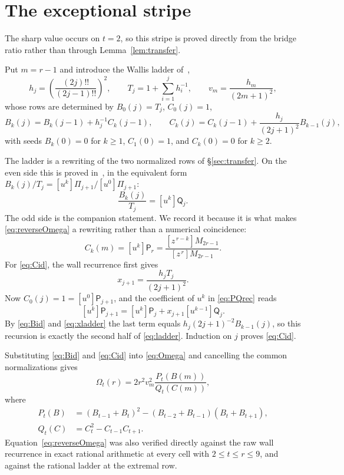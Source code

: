 \documentclass[11pt,a4paper]{article}
\theoremstyle{plain}
\theoremstyle{remark}
\begin{document}
\section{The exceptional stripe}\label{sec:t2}

The sharp value occurs on $t=2$, so this stripe is proved directly from the
bridge ratio rather than through Lemma~\ref{lem:transfer}.

Put $m=r-1$ and introduce the Wallis ladder of~\cite{squaretail},
\[
 h_j=\left(\frac{(2j)!!}{(2j-1)!!}\right)^2,
 \qquad
 T_j=1+\sum_{i=1}^{j}h_i^{-1},
 \qquad
 v_m=\frac{h_m}{(2m+1)^2},
\]
whose rows are determined by $B_0(j)=T_j$, $C_0(j)=1$,
\begin{equation}\label{eq:ladder}
 B_k(j)=B_k(j-1)+h_j^{-1}C_k(j-1),
 \qquad
 C_k(j)=C_k(j-1)+\frac{h_j}{(2j+1)^2}B_{k-1}(j),
\end{equation}
with seeds $B_k(0)=0$ for $k\ge1$, $C_1(0)=1$, and $C_k(0)=0$ for $k\ge2$.

The ladder is a rewriting of the two normalized rows of
\S\ref{sec:transfer}.  On the even side this is proved in~\cite{squaretail},
in the equivalent form $B_k(j)/T_j=[u^k]\Pi_{j+1}/[u^0]\Pi_{j+1}$:
\begin{equation}\label{eq:Bid}
 \frac{B_k(j)}{T_j}=[u^k]\mathsf Q_j .
\end{equation}
The odd side is the companion statement.  We record it because it is what
makes \eqref{eq:reverseOmega} a rewriting rather than a numerical
coincidence:
\begin{equation}\label{eq:Cid}
 C_k(m)=[u^k]\mathsf P_r
 =\frac{[z^{\,r-k}]M_{2r-1}}{[z^{\,r}]M_{2r-1}} .
\end{equation}
For \eqref{eq:Cid}, the wall recurrence first gives
\begin{equation}\label{eq:xladder}
 x_{j+1}=\frac{h_jT_j}{(2j+1)^2}.
\end{equation}
Now $C_0(j)=1=[u^0]\mathsf P_{j+1}$, and the coefficient of $u^k$ in
\eqref{eq:PQrec} reads
\[
 [u^k]\mathsf P_{j+1}=[u^k]\mathsf P_j+x_{j+1}[u^{k-1}]\mathsf Q_j .
\]
By \eqref{eq:Bid} and \eqref{eq:xladder} the last term equals
$h_j(2j+1)^{-2}B_{k-1}(j)$, so this recursion is exactly the second half of
\eqref{eq:ladder}.  Induction on $j$ proves \eqref{eq:Cid}.

Substituting \eqref{eq:Bid} and \eqref{eq:Cid} into \eqref{eq:Omega} and
cancelling the common normalizations gives
\begin{equation}\label{eq:reverseOmega}
 \Omega_t(r)=2r^2v_m^2\frac{P_t(B(m))}{Q_t(C(m))},
\end{equation}
where
\begin{align*}
 P_t(B)&=(B_{t-1}+B_t)^2
 -(B_{t-2}+B_{t-1})(B_t+B_{t+1}),\\
 Q_t(C)&=C_t^2-C_{t-1}C_{t+1}.
\end{align*}
Equation~\eqref{eq:reverseOmega} was also verified directly against the raw
wall recurrence in exact rational arithmetic at every cell with
$2\le t\le r\le9$, and against the rational ladder at the extremal row.
\end{document}

